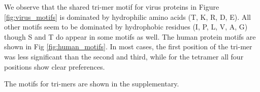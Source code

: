 \documentclass[runningheads,a4paper]{llncs}
\begin{document}
We observe that the shared tri-mer motif for virus proteins in Figure \ref{fig:virus_motifs} is dominated by 
hydrophilic amino acids (T, K, R, D, E). All other motifs seem to be dominated by hydrophobic residues (I, P, L, V, A, G)
though S and T do appear in some motifs as well.
The human protein motifs are shown in Fig \ref{fig:human_motifs}. In most cases, the first position of the tri-mer was less significant than the second and third, while for the tetramer all four positions show clear preferences.

The motifs for tri-mers are shown in the supplementary.


\begin{figure}
\begin{floatrow}


\ffigbox[0.01\columnwidth]{}


\end{floatrow}
\end{figure}
\end{document}
